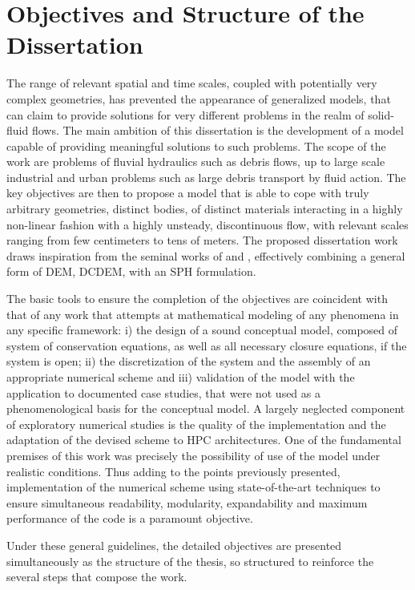 \section{Objectives and Structure of the Dissertation}
\label{sec:objectives}

The range of relevant spatial and time scales, coupled with potentially very complex geometries, has prevented the appearance of generalized models, that can claim to provide solutions for very different problems in the realm of solid-fluid flows. The main ambition of this dissertation is the development of a model capable of providing meaningful solutions to such problems. The scope of the work are problems of fluvial hydraulics such as debris flows, up to large scale industrial and urban problems such as large debris transport by fluid action. The key objectives are then to propose a model that is able to cope with truly arbitrary geometries, distinct bodies, of distinct materials interacting in a highly non-linear fashion with a highly unsteady, discontinuous flow, with relevant scales ranging from few centimeters to tens of meters. The proposed dissertation work draws inspiration from the seminal works of \cite{Koshizuka-1998} and \cite{Potapov-2001}, effectively combining a general form of \ac{DEM}, \ac{DCDEM}, with an \ac{SPH} formulation.

The basic tools to ensure the completion of the objectives are coincident with that of any work that attempts at mathematical modeling of any phenomena in any specific framework: i) the design of a sound conceptual model, composed of system of conservation equations, as well as all necessary closure equations, if the system is open; ii) the discretization of the system and the assembly of an appropriate numerical scheme and iii) validation of the model with the application to documented case studies, that were not used as a phenomenological basis for the conceptual model. A largely neglected component of exploratory numerical studies is the quality of the implementation and the adaptation of the devised scheme to \ac{HPC} architectures. One of the fundamental premises of this work was precisely the possibility of use of the model under realistic conditions. Thus adding to the points previously presented, implementation of the numerical scheme using state-of-the-art techniques to ensure simultaneous readability, modularity, expandability and maximum performance of the code is a paramount objective.

Under these general guidelines, the detailed objectives are presented simultaneously as the structure of the thesis, so structured to reinforce the several steps that compose the work.

